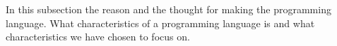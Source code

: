 In this subsection the reason and the thought for making the programming language. What characteristics of a programming language is and what characteristics we have chosen to focus on.